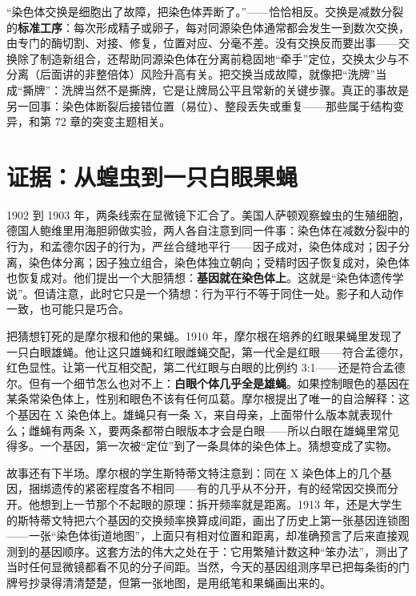 \begin{wuqu}
“染色体交换是细胞出了故障，把染色体弄断了。”——恰恰相反。交换是减数分裂的\textbf{标准工序}：每次形成精子或卵子，每对同源染色体通常都会发生一到数次交换，由专门的酶切割、对接、修复，位置对应、分毫不差。没有交换反而要出事——交换除了制造新组合，还帮助同源染色体在分离前稳固地“牵手”定位，交换太少与不分离（后面讲的非整倍体）风险升高有关。把交换当成故障，就像把“洗牌”当成“撕牌”：洗牌当然不是撕牌，它是让牌局公平且常新的关键步骤。真正的事故是另一回事：染色体断裂后接错位置（易位）、整段丢失或重复——那些属于结构变异，和第 72 章的突变主题相关。
\end{wuqu}

\section{证据：从蝗虫到一只白眼果蝇}

\begin{zhengju}
1902 到 1903 年，两条线索在显微镜下汇合了。美国人萨顿观察蝗虫的生殖细胞，德国人鲍维里用海胆卵做实验，两人各自注意到同一件事：染色体在减数分裂中的行为，和孟德尔因子的行为，严丝合缝地平行——因子成对，染色体成对；因子分离，染色体分离；因子独立组合，染色体独立朝向；受精时因子恢复成对，染色体也恢复成对。他们提出一个大胆猜想：\textbf{基因就在染色体上}。这就是“染色体遗传学说”。但请注意，此时它只是一个猜想：行为平行不等于同住一处。影子和人动作一致，也可能只是巧合。

把猜想钉死的是摩尔根和他的果蝇。1910 年，摩尔根在培养的红眼果蝇里发现了一只白眼雄蝇。他让这只雄蝇和红眼雌蝇交配，第一代全是红眼——符合孟德尔，红色显性。让第一代互相交配，第二代红眼与白眼的比例约 3:1——还是符合孟德尔。但有一个细节怎么也对不上：\textbf{白眼个体几乎全是雄蝇}。如果控制眼色的基因在某条常染色体上，性别和眼色不该有任何瓜葛。摩尔根提出了唯一的自洽解释：这个基因在 X 染色体上。雄蝇只有一条 X，来自母亲，上面带什么版本就表现什么；雌蝇有两条 X，要两条都带白眼版本才会是白眼——所以白眼在雄蝇里常见得多。一个基因，第一次被“定位”到了一条具体的染色体上。猜想变成了实物。

故事还有下半场。摩尔根的学生斯特蒂文特注意到：同在 X 染色体上的几个基因，捆绑遗传的紧密程度各不相同——有的几乎从不分开，有的经常因交换而分开。他想到上一节那个不起眼的原理：拆开频率就是距离。1913 年，还是大学生的斯特蒂文特把六个基因的交换频率换算成间距，画出了历史上第一张基因连锁图——一张“染色体街道地图”，上面只有相对位置和距离，却准确预言了后来直接观测到的基因顺序。这套方法的伟大之处在于：它用繁殖计数这种“笨办法”，测出了当时任何显微镜都看不见的分子间距。当然，今天的基因组测序早已把每条街的门牌号抄录得清清楚楚，但第一张地图，是用纸笔和果蝇画出来的。
\end{zhengju}

